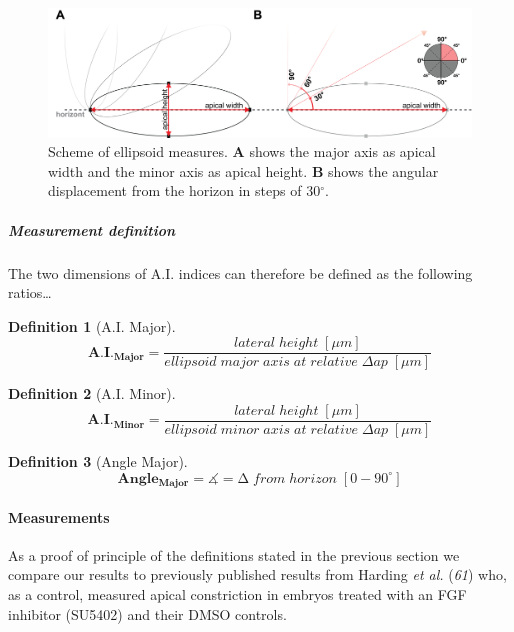 \documentclass[10pt, b5paper, singlespacinge, twoside]{reedthesis} %
\theoremstyle{definition}
\newtheorem{definition}{Definition}[chapter]
\theoremstyle{definition}
\theoremstyle{definition}
\theoremstyle{remark}
\begin{document}
\begin{figure}[H]

{\centering \includegraphics[width=0.75\linewidth]{figures/materials/models/ellipse} 

}

\caption[Scheme of ellipsoid measures]{Scheme of ellipsoid measures. \textbf{A} shows the major axis as apical width and the minor axis as apical height. \textbf{B} shows the angular displacement from the horizon in steps of 30\(^\circ\).}\label{fig:ellipse}
\end{figure}
\hypertarget{aci-theorem}{%
\subparagraph{Measurement definition}\label{aci-theorem}}

The two dimensions of A.I. indices can therefore be defined as the following ratios\ldots{}
\begin{definition}[A.I. Major]
\protect\hypertarget{def:unnamed-chunk-6}{}{\label{def:unnamed-chunk-6} {} }\[\mathbf{A.I._{Major}} = \frac{lateral\;height\;[\mu m]}{ellipsoid\;major\;axis\;at\;relative\;\Delta ap\;[\mu m]}\]
\end{definition}
\begin{definition}[A.I. Minor]
\protect\hypertarget{def:unnamed-chunk-7}{}{\label{def:unnamed-chunk-7} {} }\[\mathbf{A.I._{Minor}} = \frac{lateral\;height\;[\mu m]}{ellipsoid\;minor\;axis\;at\;relative\;\Delta ap\;[\mu m]}\]
\end{definition}
\begin{definition}[Angle Major]
\protect\hypertarget{def:unnamed-chunk-8}{}{\label{def:unnamed-chunk-8} {} }\[\mathbf{Angle_{Major}} = \measuredangle = \mathrm{\Delta}\;from\;horizon\;[0-90^\circ]\]
\end{definition}
\hypertarget{ACI-Dis}{%
\paragraph{Measurements}\label{ACI-Dis}}

As a proof of principle of the definitions stated in the previous section we compare our results to previously published results from Harding \emph{et al.} (\emph{61}) who, as a control, measured apical constriction in embryos treated with an FGF inhibitor (SU5402) and their DMSO controls.
\end{document}
